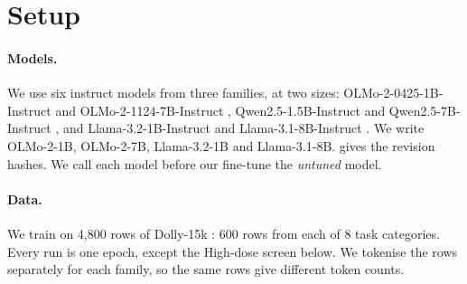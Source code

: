\documentclass[11pt]{article}
\begin{document}
\section{Setup}
\label{sec:setup}

\paragraph{Models.} We use six instruct models from three families, at two
sizes: OLMo-2-0425-1B-Instruct and OLMo-2-1124-7B-Instruct
\citep{olmo2024olmo2}, Qwen2.5-1.5B-Instruct and Qwen2.5-7B-Instruct
\citep{qwen2024qwen25}, and Llama-3.2-1B-Instruct and Llama-3.1-8B-Instruct
\citep{grattafiori2024llama}. We write OLMo-2-1B, OLMo-2-7B, Llama-3.2-1B and
Llama-3.1-8B.  gives the revision hashes. We call each model
before our fine-tune the \emph{untuned} model.

\paragraph{Data.} We train on 4,800 rows of Dolly-15k
\citep{conover2023dolly}: 600 rows from each of 8 task categories. Every run is
one epoch, except the High-dose screen below. We tokenise the rows separately
for each family, so the same rows give different token counts.

\end{document}
